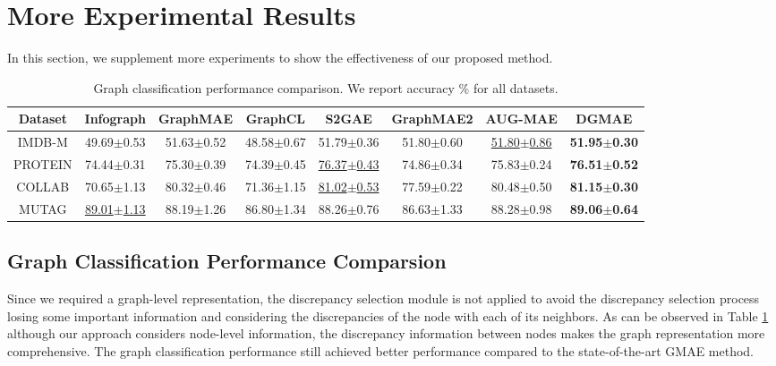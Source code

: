 \documentclass[sigconf]{acmart}
\begin{document}
\section{More Experimental Results}
\label{hyper_experiment}

In this section, we supplement more experiments to show the effectiveness of our proposed method.
\begin{table}[htbp]
    \centering
        \caption{ Graph classification performance comparison. We report accuracy \(\%\) for all datasets.}
    \begin{tabular}{c|ccccccc}
        \toprule
        Dataset  & Infograph & GraphMAE & GraphCL& S2GAE &GraphMAE2 &  AUG-MAE & \textbf{DGMAE}  \\
        \midrule
        IMDB-M & 49.69$\pm$0.53&51.63$\pm$0.52& 48.58$\pm$0.67& 51.79$\pm$0.36&51.80$\pm$0.60&\underline{51.80$\pm$0.86}&\textbf{51.95$\pm$0.30}\\
        PROTEIN & 74.44$\pm$0.31&75.30$\pm$0.39  &74.39$\pm$0.45& \underline{76.37$\pm$0.43}&74.86$\pm$0.34&75.83$\pm$0.24&\textbf{76.51$\pm$0.52}\\
        COLLAB &70.65$\pm$1.13& 80.32$\pm$0.46 &71.36$\pm$1.15& \underline{81.02$\pm$0.53}&77.59$\pm$0.22&80.48$\pm$0.50&\textbf{81.15$\pm$0.30}\\
        MUTAG & \underline{89.01$\pm$1.13}& 88.19$\pm$1.26 &86.80$\pm$1.34& 88.26$\pm$0.76&86.63$\pm$1.33&88.28$\pm$0.98&\textbf{89.06$\pm$0.64}\\

        \bottomrule
    \end{tabular}
    \label{table.graphclassification}
\end{table}

\subsection{Graph Classification Performance Comparsion}
\label{grapgclasification}
Since we required a graph-level representation, the discrepancy selection module is not applied to avoid the discrepancy selection process losing some important information and considering the discrepancies of the node with each of its neighbors. As can be observed in Table \ref{table.graphclassification} although our approach considers node-level information, the discrepancy information between nodes makes the graph representation more comprehensive. The graph classification performance still achieved better performance compared to the state-of-the-art GMAE method.
\end{document}
